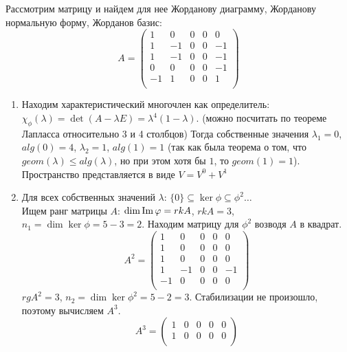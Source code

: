 \begin{example}
    Рассмотрим матрицу и найдем для нее Жорданову диаграмму, Жорданову нормальную форму, Жорданов базис:
         \[A = \begin{pmatrix}
        1      & 0     & 0    & 0  & 0 \\
        1      & -1    & 0    & 0  & -1 \\
        1      & -1    & 0    & 0  & -1 \\
        0      & 0    & 0    & 0  & -1 \\
        -1     & 1     & 0    & 0  & 1 \\
        \end{pmatrix}\]

    \begin{enumerate}
        \item Находим характеристический многочлен как определитель: 
        $\chi_{\phi}(\lambda) = \det (A - \lambda E) = \lambda^4 (1 - \lambda)$. (можно посчитать по теореме Лапласса относительно 3 и 4 столбцов)
        Тогда собственные значения $\lambda_1 = 0$, $alg(0) = 4$, $\lambda_2 = 1$, $alg(1) = 1$ (так как была теорема о том, что $geom(\lambda) \leq alg(\lambda)$, но при этом хотя бы $1$, то $geom(1) = 1$). 
        Пространство представляется в виде $V = V^0 + V^1$
        \item Для всех собственных значений $\lambda$:
        $\{0\} \subseteq \ker \phi \subseteq \phi^2 \dots$ \\
        Ищем ранг матрицы $A$: $\dim \operatorname{Im} \varphi = rk A$, $rk A = 3$, $n_1 = \dim \ker \phi = 5 - 3 = 2$.
        Находим матрицу для $\phi^2$ возводя $A$ в квадрат.
         \[A^2 = \begin{pmatrix}
        1      & 0     & 0    & 0  & 0 \\
        1      & 0     & 0    & 0  & 0 \\
        1      & 0     & 0    & 0  & 0 \\
         1      & -1    & 0    & 0  & -1 \\
        -1     & 0     & 0    & 0  & 0 \\
        \end{pmatrix}\]
        $rg A^2 = 3$, $n_2 = \dim \ker \phi^2 = 5 - 2 = 3$.
        Стабилизации не произошло, поэтому вычисляем $A^3$.
         \[A^3 = \begin{pmatrix}
        1      & 0     & 0    & 0  & 0 \\
        1      & 0     & 0    & 0  & 0 \\

\end{pmatrix}\]
\end{enumerate}
\end{example}
